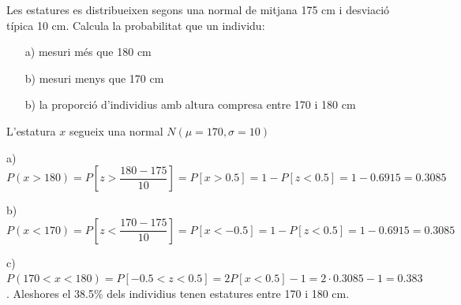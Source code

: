 \begin{resolt}[E]{Les estatures es distribueixen segons una normal de mitjana 175 cm i desviació típica 10 cm. Calcula la probabilitat que un individu: \vspace{0.2cm}
		
\hspace{-1cm}\begin{enumerate}
	\item[a)] mesuri més que 180 cm
	\item[b)] mesuri menys que 170 cm
	\item[b)] la proporció d'individius amb altura compresa entre 170 i 180 cm
\end{enumerate}	
}
	L'estatura $x$ segueix una normal $N(\mu=170, \sigma=10)$ \vspace{0.25cm}
	
	a) $P(x>180)=P\left[ z>\dfrac{180-175}{10} \right]=P\left[x>0.5\right]=1-P\left[z<0.5\right]=1-0.6915=0.3085$ \vspace{0.25cm}
	
	b) $P(x<170)=P\left[ z<\dfrac{170-175}{10} \right]=P\left[x<-0.5\right]=1-P\left[z<0.5\right]=1-0.6915=0.3085$\vspace{0.25cm}
	
	c) $P(170<x<180)=P\left[ -0.5 < z< 0.5 \right]=2P\left[x<0.5\right]-1=2\cdot 0.3085 -1=0.383$. Aleshores el 38.5\% dels individius tenen estatures entre 170 i 180 cm.
\end{resolt}
\vspace{1cm}

